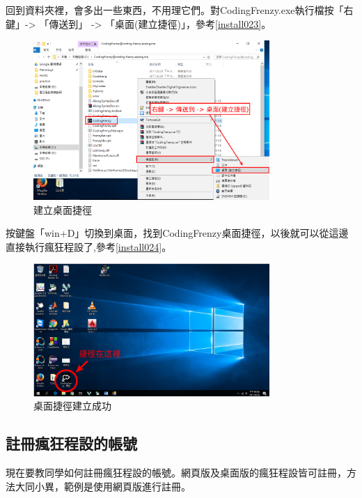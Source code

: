 		回到資料夾裡，會多出一些東西，不用理它們。對CodingFrenzy.exe執行檔按「右鍵」-> 「傳送到」 -> 「桌面(建立捷徑)」，參考\autoref{install023}。
		\begin{figure}[H]
			\centering
			\includegraphics[width=0.8\textwidth]{fig/install_and_setting/install_023}
			\caption{建立桌面捷徑}
			\label{install023}
		\end{figure}
	
	\newpage
		按鍵盤「win+D」切換到桌面，找到CodingFrenzy桌面捷徑，以後就可以從這邊直接執行瘋狂程設了,參考\autoref{install024}。
		\begin{figure}[H]
			\centering
			\includegraphics[width=0.8\textwidth]{fig/install_and_setting/install_024}
			\caption{桌面捷徑建立成功}
			\label{install024}
		\end{figure}

\newpage
\subsection{註冊瘋狂程設的帳號}
現在要教同學如何註冊瘋狂程設的帳號。網頁版及桌面版的瘋狂程設皆可註冊，方法大同小異，範例是使用網頁版進行註冊。

